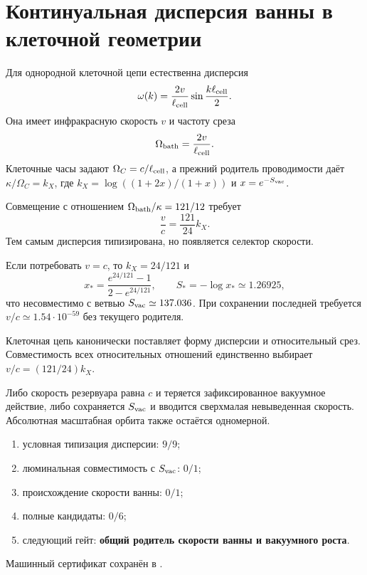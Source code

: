 \chapter{Континуальная дисперсия ванны в клеточной геометрии}
\label{ch:v10-bath-continuum-cell-dispersion}

Для однородной клеточной цепи естественна дисперсия
\begin{equation}
 \omega(k)=\frac{2v}{\ell_{\rm cell}}
 \sin\frac{k\ell_{\rm cell}}{2}.
\end{equation}
Она имеет инфракрасную скорость $v$ и частоту среза
\begin{equation}
 \Omega_{\rm bath}=\frac{2v}{\ell_{\rm cell}}.
\end{equation}
Клеточные часы задают $\Omega_C=c/\ell_{\rm cell}$, а прежний родитель
проводимости даёт $\kappa/\Omega_C=k_X$, где
$k_X=\log((1+2x)/(1+x))$ и $x=e^{-S_{\rm vac}}$.

Совмещение с отношением $\Omega_{\rm bath}/\kappa=121/12$ требует
\begin{equation}
 \boxed{\frac vc=\frac{121}{24}k_X}.
\end{equation}
Тем самым дисперсия типизирована, но появляется селектор скорости.

Если потребовать $v=c$, то $k_X=24/121$ и
\begin{equation}
 x_*=\frac{e^{24/121}-1}{2-e^{24/121}},\qquad
 S_*=-\log x_*\simeq1.26925,
\end{equation}
что несовместимо с ветвью $S_{\rm vac}\simeq137.036$. При сохранении
последней требуется $v/c\simeq1.54\cdot10^{-59}$ без текущего родителя.

\begin{theorem}
Клеточная цепь канонически поставляет форму дисперсии и относительный срез.
Совместимость всех относительных отношений единственно выбирает
$v/c=(121/24)k_X$.
\end{theorem}

\begin{nogocriterion}
Либо скорость резервуара равна $c$ и теряется зафиксированное вакуумное
действие, либо сохраняется $S_{\rm vac}$ и вводится сверхмалая невыведенная
скорость. Абсолютная масштабная орбита также остаётся одномерной.
\end{nogocriterion}

\begin{protocol}\begin{enumerate}
\item условная типизация дисперсии: \textbf{$9/9$};
\item люминальная совместимость с $S_{\rm vac}$: \textbf{$0/1$};
\item происхождение скорости ванны: \textbf{$0/1$};
\item полные кандидаты: \textbf{$0/6$};
\item следующий гейт: \textbf{общий родитель скорости ванны и вакуумного роста}.
\end{enumerate}\end{protocol}

Машинный сертификат сохранён в
.